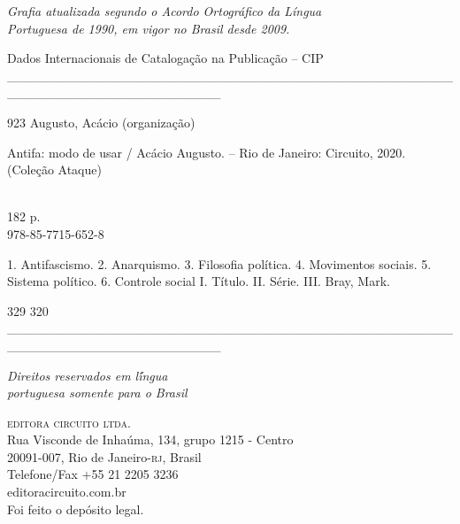 {\begingroup \tiny

\textit{Grafia atualizada segundo o Acordo Ortográfico da Língua\\
Portuguesa de 1990, em vigor no Brasil desde 2009.}\\


\begin{flushleft}
\hspace{10pt}Dados Internacionais de Catalogação na Publicação -- CIP
\_\_\_\_\_\_\_\_\_\_\_\_\_\_\_\_\_\_\_\_\_\_\_\_\_\_\_\_\_\_\_\_\_\_\_\_\_\_\_\_\_\_\_\_\_\_\_\_\_\_\_\_\_\_\_\_\_\_\_\_\_\_\_\_\_\_\_\_\_\_\_
\end{flushleft}
923 \hspace{5pt}Augusto, Acácio (organização)\\
\hspace{20pt}\parbox{185pt}{Antifa: modo de usar / Acácio Augusto. -- Rio de Janeiro: Circuito, 2020. (Coleção Ataque)}\\[2pt]

\hspace{20pt}182 p.\\[6pt]

\hspace{20pt} 978-85-7715-652-8\\[6pt]

\hspace{20pt}\parbox{185pt}{1. Antifascismo. 2. Anarquismo. 3. Filosofia política. 4. Movimentos sociais. 5. Sistema político. 6. Controle social I. Título. II. Série. III. Bray, Mark.}

\begin{flushleft}
\hspace{20pt} 329 \hspace{138pt} 320
\_\_\_\_\_\_\_\_\_\_\_\_\_\_\_\_\_\_\_\_\_\_\_\_\_\_\_\_\_\_\_\_\_\_\_\_\_\_\_\_\_\_\_\_\_\_\_\_\_\_\_\_\_\_\_\_\_\_\_\_\_\_\_\_\_\_\_\_\_\_\_\\
\end{flushleft}


\vfill\textit{Direitos reservados em l\'íngua\\ portuguesa somente para o Brasil}\\\medskip

%
\textsc{editora circuito ltda.}\\ 
Rua Visconde de Inhaúma, 134, grupo 1215 - Centro\\
20091-007, Rio de Janeiro-\textsc{rj}, Brasil\\
Telefone/Fax +55 21 2205 3236\\\smallskip
editoracircuito.com.br\\
\bigskip
Foi feito o depósito legal.\\\endgroup
\pagebreak\raggedleft
\titulagem

}

